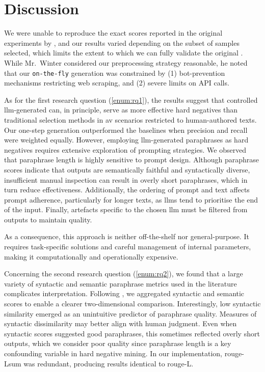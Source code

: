 \chapter{Discussion}
\label{chap:discussion}

We were unable to reproduce the exact scores reported in the original experiments by \citet{koppel_determining_2014}, and our results varied depending on the subset of samples selected, 
which limits the extent to which we can fully validate the original \impAppr{}. 
While Mr.\ Winter considered our preprocessing strategy reasonable, he noted that our \texttt{on-the-fly} \imp{} generation was constrained by (1) bot-prevention mechanisms restricting web scraping, and (2) severe limits on API calls.  

As for the first research question (\ref{enum:rq1}), the results suggest that controlled \ac{llm}-generated \imps{} can, in principle, serve as more effective hard negatives than traditional \imp{} selection methods in \ac{av} scenarios restricted to human-authored texts. 
Our one-step \imp{} generation outperformed the baselines when precision and recall were weighted equally.  
However, employing \ac{llm}-generated paraphrases as hard negatives requires extensive exploration of prompting strategies.  
We observed that paraphrase length is highly sensitive to prompt design. 
Although paraphrase scores indicate that outputs are semantically faithful and syntactically diverse, insufficient manual inspection can result in overly short paraphrases, which in turn reduce \impAppr{} effectiveness.  
Additionally, the ordering of prompt and text affects prompt adherence, particularly for longer texts, as \acp{llm} tend to prioritise the end of the input.  
Finally, artefacts specific to the chosen \ac{llm} must be filtered from outputs to maintain quality. 

As a consequence, this approach is neither off-the-shelf nor general-purpose. 
It requires task-specific solutions and careful management of internal parameters, making it computationally and operationally expensive.


Concerning the second research question (\ref{enum:rq2}), we found that a large variety of syntactic and semantic paraphrase metrics used in the literature complicates interpretation. 
Following \citet{gohsen_captions_2023}, we aggregated syntactic and semantic scores to enable a clearer two-dimensional comparison.  
Interestingly, low syntactic similarity emerged as an unintuitive predictor of paraphrase quality. 
Measures of syntactic dissimilarity may better align with human judgment.  
Even when syntactic scores suggested good paraphrases, this sometimes reflected overly short outputs, which we consider poor quality since paraphrase length is a key confounding variable in hard negative mining.  
In our implementation, \ac{rouge}-Lsum was redundant, producing results identical to \ac{rouge}-L.  

